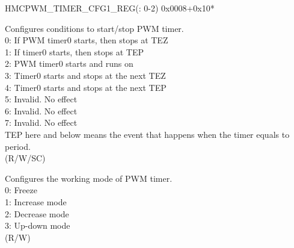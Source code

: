 \begin{register}{H}{MCPWM\_TIMER\_CFG1\_REG(: 0-2)}
{0x0008+0x10*}\label{regdesc:MCPWMTIMERNCFG1REG}
%
%
%
\regnewline%
\begin{regdesc}\begin{reglist}
\label{fielddesc:MCPWMTIMERNSTART}\item [MCPWM\_TIMER\regindex{n}\_START] Configures conditions to start/stop PWM timer. \\
0: If PWM timer0 starts, then stops at TEZ\\
1: If timer0 starts, then stops at TEP\\
2: PWM timer0 starts and runs on\\
3: Timer0 starts and stops at the next TEZ\\
4: Timer0 starts and stops at the next TEP\\
5: Invalid. No effect\\
6: Invalid. No effect\\
7: Invalid. No effect\\
TEP here and below means the event that happens when the timer equals to period. \\
(R/W/SC)
\label{fielddesc:MCPWMTIMERNMOD}\item [MCPWM\_TIMER\regindex{n}\_MOD] Configures the working mode of PWM timer.
\\0: Freeze
\\1: Increase mode
\\2: Decrease mode
\\3: Up-down mode
\\(R/W)
\end{reglist}\end{regdesc}
\end{register}


